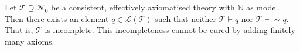 Let $\mathcal{T} \supseteq \mathcal{N}_0$ be a consistent, effectively axiomatised theory with $\mathbb{N}$ as model. Then there exists an element $q \in \mathcal{L}(\mathcal{T})$ such that neither $\mathcal{T} \vdash q$ nor $\mathcal{T} \vdash \sim q$. That is, $\mathcal{T}$ is incomplete. This incompleteness cannot be cured by adding finitely many axioms.
